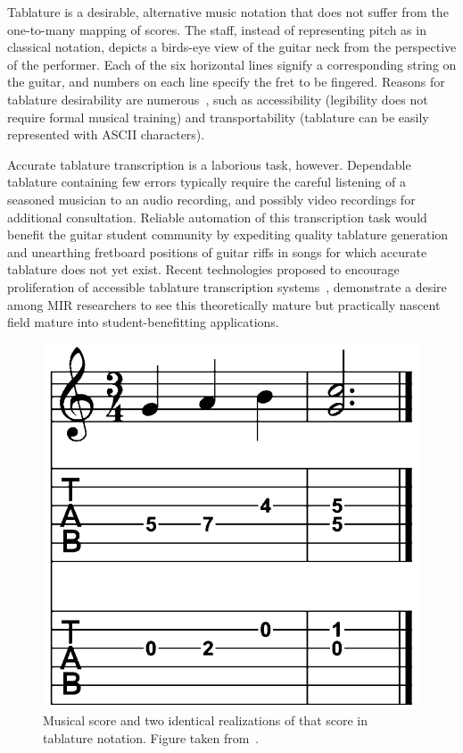 \documentclass[convention,peer-reviewed]{aesconf}
\begin{document}
Tablature is a desirable, alternative music notation that does not suffer from the one-to-many mapping of scores. The staff, instead of representing pitch as in classical notation, depicts a birds-eye view of the guitar neck from the perspective of the performer. Each of the six horizontal lines signify a corresponding string on the guitar, and numbers on each line specify the fret to be fingered. Reasons for tablature desirability are numerous~\cite{macrae2010}, such as accessibility (legibility does not require formal musical training) and transportability (tablature can be easily represented with ASCII characters). 

Accurate tablature transcription is a laborious task, however. Dependable tablature containing few errors typically require the careful listening of a seasoned musician to an audio recording, and possibly video recordings for additional consultation. Reliable automation of this transcription task would benefit the guitar student community by expediting quality tablature generation and unearthing fretboard positions of guitar riffs in songs for which accurate tablature does not yet exist. Recent technologies proposed to encourage proliferation of accessible tablature transcription systems~\cite{burlet2013}, demonstrate a desire among MIR researchers to see this theoretically mature but practically nascent field mature into student-benefitting applications. 
\begin{figure}[!htbp] 
\centering
\includegraphics[scale=0.2]{figs/score-tabs}
\caption{Musical score and two identical realizations of that score in tablature notation. Figure taken from~\cite{barbanchoi2012}.}
\label{fig:score-tabs}
\end{figure}
\end{document}
